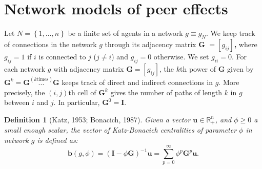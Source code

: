 \documentclass[nojss]{jss}
\newtheorem{definition}{Definition}
\begin{document}

\section{Network models of peer effects} \label{sec:models}
Let $N=\left\{ 1,\ldots ,n\right\} $ be a finite set of agents in a network $g\equiv g_{N}.$ We keep track of connections in the network $g$ through its adjacency matrix $\boldsymbol{G}$ $=[g_{ij}]$\textbf{,} where $g_{ij}=1$ if $ i$ is connected to $j$ ($j\neq i$) and $g_{ij}=0$ otherwise. We set $g_{ii}=0$. For each network $g$ with adjacency matrix $\boldsymbol{G}=[g_{ij}]$, the $k$th power of $\boldsymbol{G}$ given by $\boldsymbol{G}^{k}= \boldsymbol{G}\overset{(k\text{times})}{\boldsymbol{...}}\boldsymbol{G}$ keeps track of direct and indirect connections in $g$. More precisely, the $(i,j)$th cell of $\boldsymbol{G}^{k}$ gives the number of paths of length $k$ in $g$ between $i$ and $j$. In particular, $\boldsymbol{G}^{0}=\boldsymbol{I}$.

\begin{definition}[Katz, 1953; Bonacich, 1987] \label{Def1}
Given a vector $\boldsymbol{u}\in \mathbb{R}_{+}^{n}$, and $\phi\geq 0$ a small enough scalar, the vector of Katz-Bonacich centralities of parameter $\phi$ in network $g$ is defined as: 
\begin{equation}
\boldsymbol{b}\left( g,\phi \right) =\left( \boldsymbol{I}-\phi \boldsymbol{G}\right) ^{-1}\boldsymbol{u=}\sum\limits_{p=0}^{\infty}\phi ^{p}%
\boldsymbol{G}^{p}\boldsymbol{u}.  
\label{KB}
\end{equation}
\end{definition}
\end{document}
